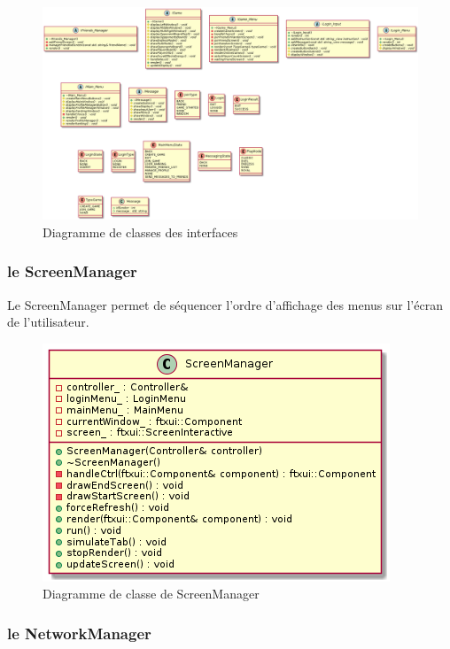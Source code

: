 \documentclass{article}
\begin{document}
\begin{figure}[H]
    \centering
    \includegraphics[scale=0.3]{../res/uml/class/InterfaceClass.png}
    \caption{Diagramme de classes des interfaces}
    \label{fig:InterfaceDiagram}
\end{figure}

\subsubsection*{le ScreenManager}

Le ScreenManager permet de séquencer l'ordre d'affichage des menus sur l'écran de l'utilisateur.

\begin{figure}[H]
    \centering
    \includegraphics[scale=0.4]{../res/uml/class/ScreenManagerClass.png}
    \caption{Diagramme de classe de ScreenManager}
    \label{fig:ScreenManagerDiagram}
\end{figure}

\subsubsection{le NetworkManager}
\end{document}
